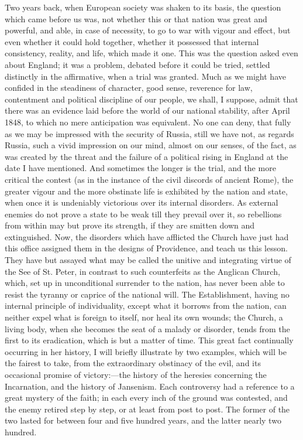 Two years back, when European society was shaken to its basis, the
question which came before us was, not whether this or that nation was
great and powerful, and able, in case of necessity, to go to war with
vigour and effect, but even whether it could hold together, whether it
possessed that internal consistency, reality, and life, which made it
one. This was the question asked even about England; it was a problem,
debated before it could be tried, settled distinctly in the
affirmative, when a trial was granted. Much as we might have confided
in the steadiness of character, good sense, reverence for law,
contentment and political discipline of our people, we shall, I
suppose, admit that there was an evidence laid before the world of our
national stability, after April 1848, to which no mere anticipation
was equivalent. No one can deny, that fully as we may be impressed
with the security of Russia, still we have not, as regards Russia,
such a vivid impression on our mind, almost on our senses, of the
fact, as was created by the threat and the failure of a political
rising in England at the date I have mentioned. And sometimes the
longer is the trial, and the more critical the contest (as in the
instance of the civil discords of ancient Rome), the greater vigour
and the more obstinate life is exhibited by the nation and state, when
once it is undeniably victorious over its internal disorders. As
external enemies do not prove a state to be weak till they prevail
over it, so rebellions from within may but prove its strength, if they
are smitten down and extinguished. Now, the disorders which have
afflicted the Church have just had this office assigned them in the
designs of Providence, and teach us this lesson. They have but assayed
what may be called the unitive and integrating virtue of the See of
St. Peter, in contrast to such counterfeits as the Anglican Church,
which, set up in unconditional surrender to the nation, has never been
able to resist the tyranny or caprice of the national will. The
Establishment, having no internal principle of individuality, except
what it borrows from the nation, can neither expel what is foreign to
itself, nor heal its own wounds; the Church, a living body, when she
becomes the seat of a malady or disorder, tends from the first to its
eradication, which is but a matter of time. This great fact
continually occurring in her history, I will briefly illustrate by two
examples, which will be the fairest to take, from the extraordinary
obstinacy of the evil, and its occasional promise of victory:—the
history of the heresies concerning the Incarnation, and the history of
Jansenism. Each controversy had a reference to a great mystery of the
faith; in each every inch of the ground was contested, and the enemy
retired step by step, or at least from post to post. The former of the
two lasted for between four and five hundred years, and the latter
nearly two hundred.

